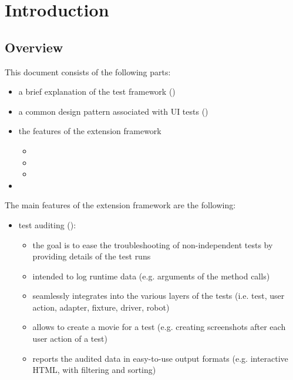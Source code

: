 
\chapter{Introduction}\label{chap:intro}

\section{Overview}\label{sec:overview}

This document consists of the following parts:
\begin{itemize}
\item a brief explanation of the test framework ()
\item a common design pattern associated with UI tests ()
\item the features of the extension framework
	\begin{itemize}
	\item {}
	\item {}
	\item {}
	\end{itemize}
\item {}
\end{itemize}

\noindent The main features of the extension framework are the following:
\begin{itemize}
\item test auditing ():
	\begin{itemize}
	\item the goal is to ease the troubleshooting of non-independent tests by providing details of the test runs
	\item intended to log runtime data (e.g. arguments of the method calls)
	\item seamlessly integrates into the various layers of the tests (i.e. test, user action, adapter, fixture, driver, robot)
	\item allows to create a movie for a test (e.g. creating screenshots after each user action of a test)
	\item reports the audited data in easy-to-use output formats (e.g. interactive HTML, with filtering and sorting)
	\end{itemize}
\end{itemize}

